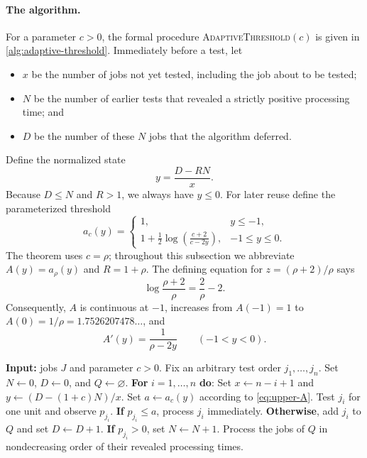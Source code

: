 \paragraph{The algorithm.}
For a parameter $c>0$, the formal procedure
\textsc{AdaptiveThreshold}$(c)$ is given in
\cref{alg:adaptive-threshold}.  Immediately before a test, let
\begin{itemize}
\item $x$ be the number of jobs not yet tested, including the job about to be
      tested;
\item $N$ be the number of earlier tests that revealed a strictly positive
      processing time; and
\item $D$ be the number of these $N$ jobs that the algorithm deferred.
\end{itemize}
Define the normalized state
\begin{equation}
\label{eq:upper-y}
 y=\frac{D-RN}{x}.
\end{equation}
Because $D\le N$ and $R>1$, we always have $y\le0$.  For later reuse define
the parameterized threshold
\begin{equation}
\label{eq:upper-A}
 a_c(y)=
 \begin{cases}
  1, & y\le-1,\\[1mm]
  \displaystyle
  1+\frac12\log\!\left(\frac{c+2}{c-2y}\right),
       & -1\le y\le0.
 \end{cases}
\end{equation}
The theorem uses $c=\rho$; throughout this subsection we abbreviate
$A(y)=a_\rho(y)$ and $R=1+\rho$.
The defining equation for $z=(\rho+2)/\rho$ says
\begin{equation}
\label{eq:upper-root-rho}
 \log\frac{\rho+2}{\rho}=\frac2\rho-2.
\end{equation}
Consequently, $A$ is continuous at $-1$, increases from $A(-1)=1$ to
$A(0)=1/\rho=1.7526207478\ldots$, and
\begin{equation}
\label{eq:upper-A-prime}
 A'(y)=\frac{1}{\rho-2y}
 \qquad (-1<y<0).
\end{equation}

\begin{algorithm}[H]
\caption{\textsc{AdaptiveThreshold}$(J,c)$}
\label{alg:adaptive-threshold}
\begin{algorithmic}
\Statex \textbf{Input:} jobs $J$ and parameter $c>0$.
\State Fix an arbitrary test order $j_1,\ldots,j_n$.
\State Set $N\gets0$, $D\gets0$, and $Q\gets\varnothing$.
\State \textbf{For} $i=1,\ldots,n$ \textbf{do}:
\State \quad Set $x\gets n-i+1$ and $y\gets(D-(1+c)N)/x$.
\State \quad Set $a\gets a_c(y)$ according to \cref{eq:upper-A}.
\State \quad Test $j_i$ for one unit and observe $p_{j_i}$.
\State \quad \textbf{If} $p_{j_i}\le a$, process $j_i$ immediately.
\State \quad \textbf{Otherwise}, add $j_i$ to $Q$ and set $D\gets D+1$.
\State \quad \textbf{If} $p_{j_i}>0$, set $N\gets N+1$.
\State Process the jobs of $Q$ in nondecreasing order of their revealed
       processing times.
\end{algorithmic}
\end{algorithm}


